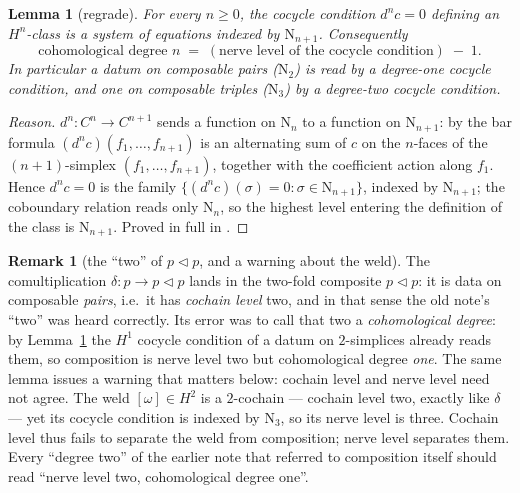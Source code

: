 \documentclass[11pt]{article}
\newtheorem{lemma}[theorem]{Lemma}
\theoremstyle{definition}
\newtheorem{remark}[theorem]{Remark}
\newcommand{\lto}{\!\lhd\!}
\newcommand{\Nerve}{\mathrm{N}}
\begin{document}
\begin{lemma}[regrade]\label{lem:regrade}
For every $n\ge 0$, the cocycle condition $d^n c=0$ defining an $H^n$-class is a system of equations
indexed by $\Nerve_{n+1}$. Consequently
\[
   \text{cohomological degree }n \;=\; (\text{nerve level of the cocycle condition})\;-\;1.
\]
In particular a datum on composable pairs ($\Nerve_2$) is read by a degree-\emph{one} cocycle
condition, and one on composable triples ($\Nerve_3$) by a degree-two cocycle condition.
\end{lemma}

\begin{proof}[Reason]
$d^n\colon C^n\to C^{n+1}$ sends a function on $\Nerve_n$ to a function on $\Nerve_{n+1}$: by the bar
formula $(d^n c)(f_1,\dots,f_{n+1})$ is an alternating sum of $c$ on the $n$-faces of the
$(n+1)$-simplex $(f_1,\dots,f_{n+1})$, together with the coefficient action along $f_1$. Hence
$d^n c=0$ is the family $\{(d^n c)(\sigma)=0:\sigma\in\Nerve_{n+1}\}$, indexed by $\Nerve_{n+1}$; the
coboundary relation reads only $\Nerve_n$, so the highest level entering the definition of the class
is $\Nerve_{n+1}$. Proved in full in \cite{MacBethNerve}.
\end{proof}

\begin{remark}[the ``two'' of $p\lto p$, and a warning about the weld]\label{rem:simpvsdeg}
The comultiplication $\delta\colon p\to p\lto p$ lands in the two-fold composite $p\lto p$: it is data
on composable \emph{pairs}, i.e.\ it has \emph{cochain level} two, and in that sense the old note's
``two'' was heard correctly. Its error was to call that two a \emph{cohomological degree}: by
Lemma~\ref{lem:regrade} the $H^1$ cocycle condition of a datum on $2$-simplices already reads them,
so composition is nerve level two but cohomological degree \emph{one}. The same lemma issues a
warning that matters below: cochain level and nerve level need not agree. The weld $[\omega]\in H^2$
is a $2$-cochain --- cochain level two, exactly like $\delta$ --- yet its cocycle condition is indexed
by $\Nerve_3$, so its nerve level is three. Cochain level thus fails to separate the weld from
composition; nerve level separates them. Every ``degree two'' of the earlier note that referred to
composition itself should read ``nerve level two, cohomological degree one''.
\end{remark}
\end{document}
